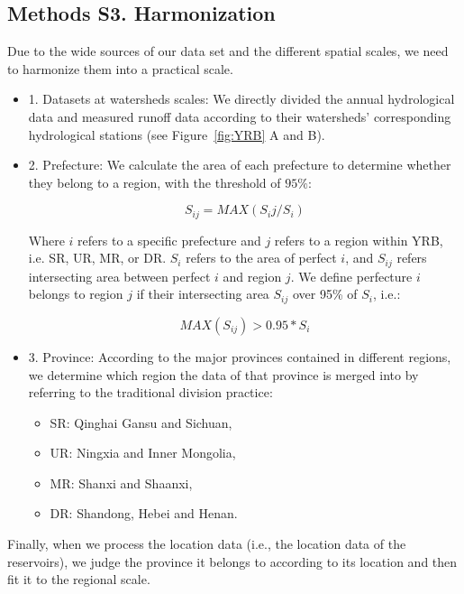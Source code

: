\subsection*{Methods S3. Harmonization}
Due to the wide sources of our data set and the different spatial scales, we need to harmonize them into a practical scale.
\begin{itemize}
    \item 1. Datasets at watersheds scales:
        We directly divided the annual hydrological data and measured runoff data according to their watersheds' corresponding hydrological stations (see Figure~\ref{fig:YRB} A and B).
    \item 2. Prefecture:
        We calculate the area of each prefecture to determine whether they belong to a region, with the threshold of $95\%$:

        \begin{equation}
            S_{ij} = MAX(S_ij / S_i)
        \end{equation}

        Where $i$ refers to a specific prefecture and $j$ refers to a region within YRB, i.e. SR, UR, MR, or DR. $S_i$ refers to the area of perfect $i$, and $S_{ij}$ refers intersecting area between perfect $i$ and region $j$.
        We define perfecture $i$ belongs to region $j$ if their intersecting area $S_{ij}$ over 95\% of $S_i$, i.e.:

        \begin{equation}
            MAX(S_{ij}) > 0.95 * S_i
        \end{equation}
    \item 3. Province:
        According to the major provinces contained in different regions, we determine which region the data of that province is merged into by referring to the traditional division practice:
    \begin{itemize}
        \item SR: Qinghai Gansu and Sichuan,
        \item UR: Ningxia and Inner Mongolia,
        \item MR: Shanxi and Shaanxi,
        \item DR: Shandong, Hebei and Henan.
    \end{itemize}
\end{itemize}

Finally, when we process the location data (i.e., the location data of the reservoirs), we judge the province it belongs to according to its location and then fit it to the regional scale.

